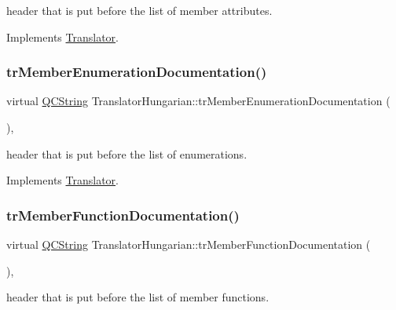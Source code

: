 header that is put before the list of member attributes. 

Implements \mbox{\hyperlink{class_translator}{Translator}}.

\mbox{\label{class_translator_hungarian_a81b7fe53f2c111be7b7d64fe086b92cf}} 
\subsubsection{\texorpdfstring{trMemberEnumerationDocumentation()}{trMemberEnumerationDocumentation()}}
{\footnotesize\ttfamily virtual \mbox{\hyperlink{class_q_c_string}{Q\+C\+String}} Translator\+Hungarian\+::tr\+Member\+Enumeration\+Documentation (\begin{DoxyParamCaption}{ }\end{DoxyParamCaption})\hspace{0.3cm}{\ttfamily [inline]}, {\ttfamily [virtual]}}

header that is put before the list of enumerations. 

Implements \mbox{\hyperlink{class_translator}{Translator}}.

\mbox{\label{class_translator_hungarian_ac3eda5dd001c19fc60ff48220a732acd}} 
\subsubsection{\texorpdfstring{trMemberFunctionDocumentation()}{trMemberFunctionDocumentation()}}
{\footnotesize\ttfamily virtual \mbox{\hyperlink{class_q_c_string}{Q\+C\+String}} Translator\+Hungarian\+::tr\+Member\+Function\+Documentation (\begin{DoxyParamCaption}{ }\end{DoxyParamCaption})\hspace{0.3cm}{\ttfamily [inline]}, {\ttfamily [virtual]}}

header that is put before the list of member functions. 

